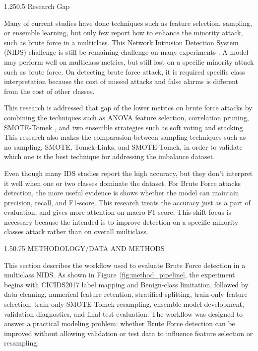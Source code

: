 \documentclass[12pt,a4paper]{article}
\makeatletter
\renewcommand{\section}{\@startsection{section}{1}{0pt}%
  {1.5\baselineskip}{0.75\baselineskip}%
  {\normalfont\fontsize{13}{15.6}\selectfont\bfseries}}
\renewcommand{\subsection}{\@startsection{subsection}{2}{0pt}%
  {1.25\baselineskip}{0.5\baselineskip}%
  {\normalfont\fontsize{13}{15.6}\selectfont\bfseries}}
\makeatother
\begin{document}
\subsection{Research Gap}

Many of current studies have done techniques such as feature selection, sampling, or ensemble learning, but only few report how to enhance the minority attack, such as brute force in a multiclass. This Network Intrusion Detection System (NIDS) challenge is still be remaining challenge on many experiments \parencite{xu2025fewshot,wardana2024collaborative}. A model may perform well on multiclass metrics, but still lost on a specific minority attack such as brute force. On detecting brute force attack, it is required specific class interpretation because the cost of missed attacks and false alarms is different from the cost of other classes.

This research is addressed that gap of the lower metrics on brute force attacks by combining the techniques such as ANOVA feature selection, correlation pruning, SMOTE-Tomek , and two ensemble strategies such as soft voting and stacking. This research also makes the comparasion between sampling techniques such as no sampling, SMOTE, Tomek-Links, and SMOTE-Tomek, in order to validate which one is the best technique for addressing the imbalance dataset. 

Even though many IDS studies report the high accuracy, but they don't interpret it well when one or two classes dominate the dataset. For Brute Force attacks detection, the more useful evidence is shows whether the model can maintain precision, recall, and F1-score. This research treats the accuracy just as a part of evaluation, and gives more attention on macro F1-score. This shift focus is necessary because the intended is to improve detection on a specific minority classes attack rather than on overall multiclass.

\section{METHODOLOGY/DATA AND METHODS}

This section describes the workflow used to evaluate Brute Force detection in a multiclass NIDS. As shown in Figure~\ref{fig:method_pipeline}, the experiment begins with CICIDS2017 label mapping and Benign-class limitation, followed by data cleaning, numerical feature retention, stratified splitting, train-only feature selection, train-only SMOTE-Tomek resampling, ensemble model development, validation diagnostics, and final test evaluation. The workflow was designed to answer a practical modeling problem: whether Brute Force detection can be improved without allowing validation or test data to influence feature selection or resampling.
\end{document}
